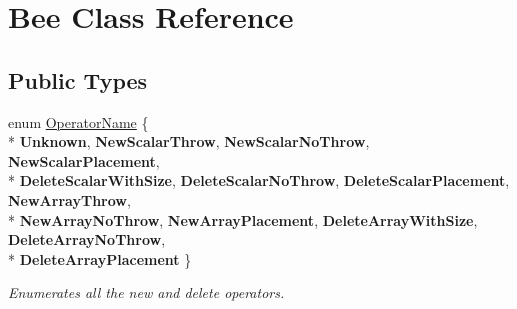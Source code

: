 \hypertarget{classBee}{}\section{Bee Class Reference}
\label{classBee}
\subsection*{Public Types}
\begin{DoxyCompactItemize}
\item 
\hypertarget{classBee_add839b64c40f624da9900f046bc5d201}{}enum \hyperlink{classBee_add839b64c40f624da9900f046bc5d201}{Operator\+Name} \{ \\*
{\bfseries Unknown}, 
{\bfseries New\+Scalar\+Throw}, 
{\bfseries New\+Scalar\+No\+Throw}, 
{\bfseries New\+Scalar\+Placement}, 
\\*
{\bfseries Delete\+Scalar\+With\+Size}, 
{\bfseries Delete\+Scalar\+No\+Throw}, 
{\bfseries Delete\+Scalar\+Placement}, 
{\bfseries New\+Array\+Throw}, 
\\*
{\bfseries New\+Array\+No\+Throw}, 
{\bfseries New\+Array\+Placement}, 
{\bfseries Delete\+Array\+With\+Size}, 
{\bfseries Delete\+Array\+No\+Throw}, 
\\*
{\bfseries Delete\+Array\+Placement}
 \}\label{classBee_add839b64c40f624da9900f046bc5d201}
\begin{DoxyCompactList}\small\item\em Enumerates all the new and delete operators. \end{DoxyCompactList}
\end{DoxyCompactItemize}
